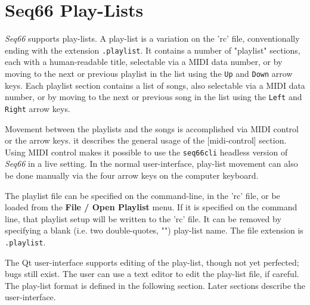 %
%
%

\section{Seq66 Play-Lists}
\label{sec:playlist}

   \textsl{Seq66} supports play-lists.
   A play-list is a variation on the 'rc' file, conventionally ending with the
   extension \texttt{.playlist}.  It contains a number of "playlist" sections,
   each with a human-readable title, selectable via a MIDI data number,
   or by moving to the next or previous playlist in the list using the
   \texttt{Up} and \texttt{Down} arrow keys.
   Each playlist section contains a list of songs, also selectable via a MIDI
   data number, or by moving to the next or previous song in the list using the
   \texttt{Left} and \texttt{Right} arrow keys.

   Movement between the playlists and the songs is accomplished via 
   MIDI control or the arrow keys.
   it describes the general usage of the [midi-control] section.
   Using MIDI control makes it possible to use the \texttt{seq66cli}
   headless version of \textsl{Seq66} in a live setting.
   In the normal user-interface, play-list movement
   can also be done manually via the four arrow keys on the computer
   keyboard.

   The playlist file can be specified on the command-line, in
   the 'rc' file, or be loaded
   from the \textbf{File / Open Playlist} menu.
   If it is specified on the command line, that playlist setup will
   be written to the 'rc' file.  It can be removed by specifying a blank (i.e.
   two double-quotes, "") play-list name.
   The file extension is \texttt{.playlist}.

   The Qt user-interface supports editing of the play-list, though not yet
   perfected; bugs still exist.
   The user can use a text editor to edit the play-list file, if careful.
   The play-list format is defined in the following section.
   Later sections describe the user-interface.

